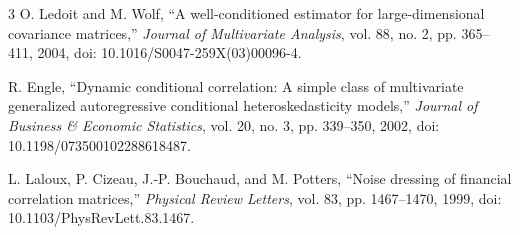 \documentclass[10pt,conference]{IEEEtran}
\begin{document}
\begin{thebibliography}{3}
O. Ledoit and M. Wolf, ``A well-conditioned estimator for large-dimensional covariance matrices,'' \emph{Journal of Multivariate Analysis}, vol. 88, no. 2, pp. 365--411, 2004, doi: 10.1016/S0047-259X(03)00096-4.

R. Engle, ``Dynamic conditional correlation: A simple class of multivariate generalized autoregressive conditional heteroskedasticity models,'' \emph{Journal of Business \& Economic Statistics}, vol. 20, no. 3, pp. 339--350, 2002, doi: 10.1198/073500102288618487.

L. Laloux, P. Cizeau, J.-P. Bouchaud, and M. Potters, ``Noise dressing of financial correlation matrices,'' \emph{Physical Review Letters}, vol. 83, pp. 1467--1470, 1999, doi: 10.1103/PhysRevLett.83.1467.
\end{thebibliography}
\end{document}

